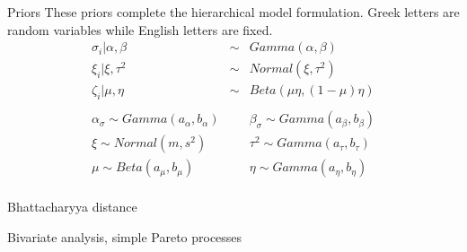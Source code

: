\documentclass[mathserif, 11pt, t]{beamer}
\begin{document}
\begin{frame}{Priors}
\noindent These priors complete the hierarchical model formulation. Greek letters are random variables while English letters are fixed.
\begin{eqnarray*}
\sigma_i|\alpha, \beta &\sim& Gamma(\alpha, \beta) \\
\xi_i|\xi, \tau^2  &\sim& Normal(\xi, \tau^2) \\
\zeta_i|\mu, \eta &\sim& Beta(\mu\eta, (1-\mu)\eta) \\
 \\
\alpha_\sigma \sim Gamma(a_\alpha, b_\alpha)&  &\beta_\sigma \sim Gamma(a_\beta, b_\beta) \\
\xi \sim Normal(m, s^2)&  &\tau^2 \sim Gamma(a_\tau, b_\tau) \\
\mu \sim Beta(a_\mu, b_\mu)&  &\eta \sim Gamma(a_\eta, b_\eta) \\
\end{eqnarray*}

\end{frame}


\begin{frame}{Bhattacharyya distance}

\end{frame}



\begin{frame}{Bivariate analysis, simple Pareto processes}

\end{frame}
\end{document}
